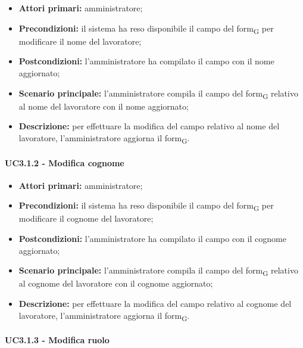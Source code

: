 \begin{itemize}
	\item 	\textbf{Attori primari:} amministratore;
	\item 	\textbf{Precondizioni:} il sistema ha reso disponibile il campo del form\textsubscript{G} per modificare il nome del lavoratore;
	\item 	\textbf{Postcondizioni:}  l'amministratore ha compilato il campo con il nome aggiornato;
	\item 	\textbf{Scenario principale:} l'amministratore compila il campo del form\textsubscript{G} relativo al nome del lavoratore con il nome aggiornato;
	\item 	\textbf{Descrizione:} per effettuare la modifica del campo relativo al nome del lavoratore, l'amministratore aggiorna il form\textsubscript{G}.
\end{itemize}

\paragraph{UC3.1.2 - Modifica cognome}

\begin{itemize}
	\item 	\textbf{Attori primari:} amministratore;
	\item 	\textbf{Precondizioni:} il sistema ha reso disponibile il campo del form\textsubscript{G} per modificare il cognome del lavoratore;
	\item 	\textbf{Postcondizioni:} l'amministratore ha compilato il campo con il cognome aggiornato;
	\item 	\textbf{Scenario principale:} l'amministratore compila il campo del form\textsubscript{G} relativo al cognome del lavoratore con il cognome aggiornato;
	\item 	\textbf{Descrizione:} per effettuare la modifica del campo relativo al cognome del lavoratore, l'amministratore aggiorna il form\textsubscript{G}.

\end{itemize}
\paragraph{UC3.1.3 - Modifica ruolo}

